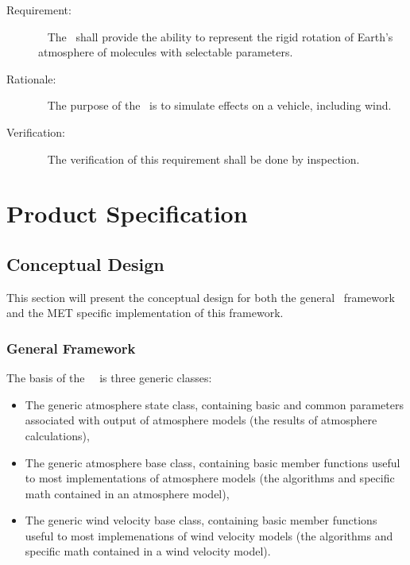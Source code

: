 \label{reqt:atmos_wind}
\begin{description}
\item[Requirement:]\ \newline
The \atmosphereDesc\ shall provide the ability to represent the
rigid rotation of Earth's atmosphere of molecules with
selectable parameters.
\item[Rationale:]\ \newline
The purpose of the \atmosphereDesc\ is to simulate effects on a vehicle,
including wind.
\item[Verification:]\ \newline
The verification of this requirement shall be done by inspection.
\end{description}

\chapter{Product Specification}\label{ch:spec}

\section{Conceptual Design}

This section will present the conceptual design for both the general
\atmosphereDesc\ framework and the MET specific implementation of this framework.

\subsection{General Framework}

The basis of the \JEODid\ \atmosphereDesc\ is three generic classes:

\begin{itemize}
\item{The generic atmosphere state class}, containing basic and common parameters
associated with output of atmosphere models
(the results of atmosphere calculations),
\item{The generic atmosphere base class}, containing basic member functions
useful to most implementations of atmosphere models (the algorithms and specific
math contained in an atmosphere model),
\item{The generic wind velocity base class}, containing basic member functions
useful to most implemenations of wind velocity models (the algorithms and specific
math contained in a wind velocity model).
\end{itemize}


